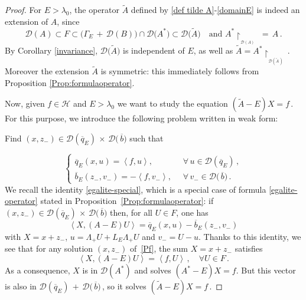 \documentclass[12pt,reqno]{amsart}
\newcommand{\innerproduct}[2]{\left\langle #1, #2 \right\rangle}
\newcommand{\be}[1]{\begin{equation}\label{#1}}
\newcommand{\ee}{\end{equation}}
\renewcommand{\(}{\left(}
\renewcommand{\)}{\right)}
\begin{document}
\begin{proof}\noindent For $E>\lambda_0$, the operator $\widetilde A$ defined by \eqref{def tilde A}-\eqref{domainE} is indeed an extension of $A$, since
\[
\mathcal D(A)\subset F\subset \big(\Gamma_E\,+\,\mathcal D\(B\)\big)\cap \mathcal D\big(A^*\big)\subset \mathcal D\big(\widetilde A\big)\quad\mbox{and $A^*\upharpoonright_{_{\mathcal D(A)}}\;=\,A$}\,.
\]
By Corollary \ref{invariance},
$\mathcal D\big(\widetilde A\big)$ is independent of $E$, as well as $\widetilde A=A^*\upharpoonright_{_{\mathcal D\(\widetilde A\,\)}}\,$. Moreover the extension $\widetilde A$ is symmetric: this immediately follows from Proposition \ref{Prop:formulaoperator}.

Now, given $f\in \mathcal H$ and $E>\lambda_0$ we want to study the equation $(\widetilde A-E)X=f\,$.
For this purpose, we introduce the following problem written in weak form:\\[4pt]
{\it \centerline{Find $(x, z_-) \in \mathcal D(\overline{q}_E)\,\times\, \mathcal D\big(\,\overline{b}\big)$ such that}}
\be{Pf}\tag{$\mathcal P_f$}
\left\{\begin{array}{ll}
\overline q_E(x, u)=\innerproduct{f}{u},\;\; & \forall\,u\in \mathcal D(\overline{q}_E)\,,\\[4pt]
\overline{b}_E(z_-,v_-)= -\innerproduct{f}{v_-},\;\; &\forall\,v_-\in \mathcal D\big(\,\overline{b}\big)\,.
\end{array} \right.
\ee
We recall the identity \eqref{egalite-special}, which is a special case of formula \eqref{egalite-operator} stated in Proposition~\ref{Prop:formulaoperator}: if $(x, z_-) \in \mathcal D(\overline{q}_E)\,\times\, \mathcal D\big(\,\overline{b}\big)$ then, for all $U\in F$, one has
\[ \innerproduct{X}{(A-E)U}=  \overline q_E\(x, u\)- \overline{b}_E(z_-,v_-)\]
with $X=x+z_-$, $u=\Lambda_+ U + L_E\Lambda_+U$ and $v_-=U-u$.
Thanks to this identity, we see that for any solution $(x, z_-)$ of~\eqref{Pf}, the sum $X=x+z_-$ satisfies
\[
\innerproduct{X}{(A-E)U}= \innerproduct{f}{U}\,,\quad\forall U\in F\,.
\]
As a consequence, $X$ is in $\mathcal D(A^*)$ and solves $(A^*-E) X=f$. But this vector is also in $\mathcal D(\overline{q}_E)\,+\, \mathcal D\big(\,\overline{b}\big)\,$, so it solves $(\widetilde A-E)X=f\,$.


\end{proof}
\end{document}
